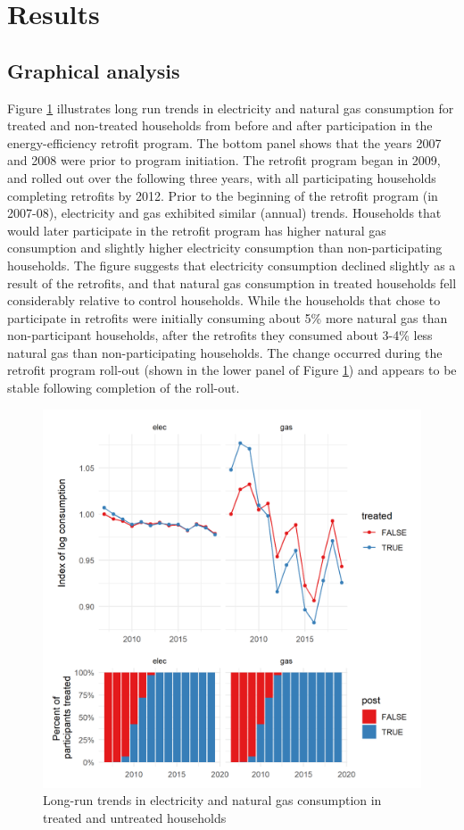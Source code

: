 \documentclass{article}
\begin{document}
\section{Results}

\subsection{Graphical analysis}
Figure \ref{fig_agg} illustrates long run trends in electricity and natural gas consumption for treated and non-treated households from before and after participation in the energy-efficiency retrofit program. The bottom panel shows that the years 2007 and 2008 were prior to program initiation. The retrofit program began in 2009, and rolled out over the following three years, with all participating households completing retrofits by 2012. Prior to the beginning of the retrofit program (in 2007-08), electricity and gas exhibited similar (annual) trends. Households that would later participate in the retrofit program has higher natural gas consumption and slightly higher electricity consumption than non-participating households. The figure suggests that electricity consumption declined slightly as a result of the retrofits, and that natural gas consumption in treated households fell considerably relative to control households. While the households that chose to participate in retrofits were initially consuming about 5\% more natural gas than non-participant households, after the retrofits they consumed about 3-4\% less natural gas than non-participating households. The change occurred during the retrofit program roll-out (shown in the lower panel of Figure \ref{fig_agg}) and appears to be stable following completion of the roll-out.

\begin{figure}
	\includegraphics{../output_figures_tables/aggregate_trend_graph}
	\caption{Long-run trends in electricity and natural gas consumption in treated and untreated households}\label{fig_agg}
\end{figure}
\end{document}
